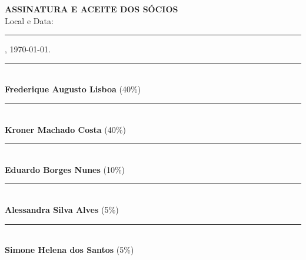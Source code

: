 \documentclass[12pt, a4paper]{article}
\begin{document}
\vspace{1.5cm}
\begin{center}
    \textbf{ASSINATURA E ACEITE DOS SÓCIOS} \\
    \vspace{2.5cm}
    Local e Data: \rule{6cm}{0.5pt}, \today.
\end{center}

\vspace{4cm}

\begin{center}
    \rule{10cm}{0.5pt} \\ \textbf{Frederique Augusto Lisboa} (40\%) \\ \vspace{2cm}
    \rule{10cm}{0.5pt} \\ \textbf{Kroner Machado Costa} (40\%) \\ \vspace{2cm}
    \rule{10cm}{0.5pt} \\ \textbf{Eduardo Borges Nunes} (10\%) \\ \vspace{2cm}
    \rule{10cm}{0.5pt} \\ \textbf{Alessandra Silva Alves} (5\%) \\ \vspace{2cm}
    \rule{10cm}{0.5pt} \\ \textbf{Simone Helena dos Santos} (5\%)
\end{center}
\end{document}
